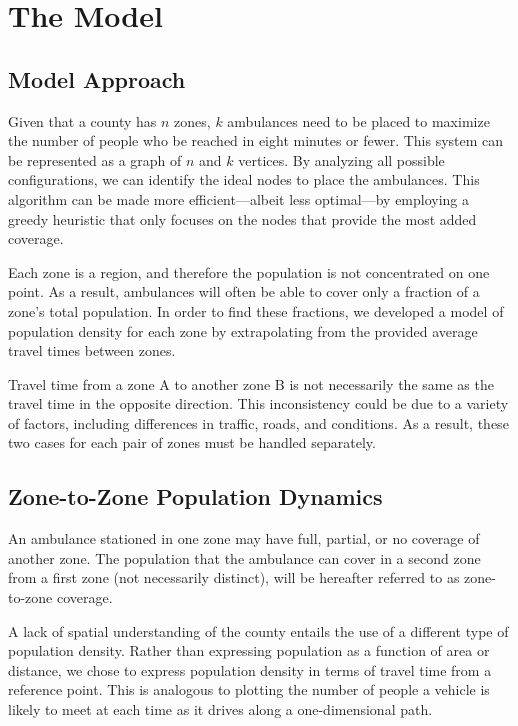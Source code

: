 \documentclass[notitlepage, 12pt]{article}
\begin{document}
\section{The Model}

\subsection{Model Approach}

Given that a county has $n$ zones, $k$ ambulances need to be placed to maximize the number of people who be reached in eight minutes or fewer. This system can be represented as a graph of $n$ and $k$ vertices. By analyzing all possible configurations, we can identify the ideal nodes to place the ambulances. This algorithm can be made more efficient---albeit less optimal---by employing a greedy heuristic that only focuses on the nodes that provide the most added coverage.

Each zone is a region, and therefore the population is not concentrated on one point. As a result, ambulances will often be able to cover only a fraction of a zone's total population. In order to find these fractions, we developed a model of population density for each zone by extrapolating from the provided average travel times between zones.

Travel time from a zone A to another zone B is not necessarily the same as the travel time in the opposite direction. This inconsistency could be due to a variety of factors, including differences in traffic, roads, and conditions. As a result, these two cases for each pair of zones must be handled separately.

\subsection{Zone-to-Zone Population Dynamics}
An ambulance stationed in one zone may have full, partial, or no coverage of another zone. The population
that the ambulance can cover in a second zone from a first zone (not necessarily distinct),
will be hereafter referred to as zone-to-zone coverage.

A lack of spatial understanding of the county entails the use of a different type of population density. Rather than expressing population as a function of area or distance, we chose to express population density in terms of travel time from a reference point. This is analogous to plotting the number of people a vehicle is likely to meet at each time as it drives along a one-dimensional path.
\end{document}
